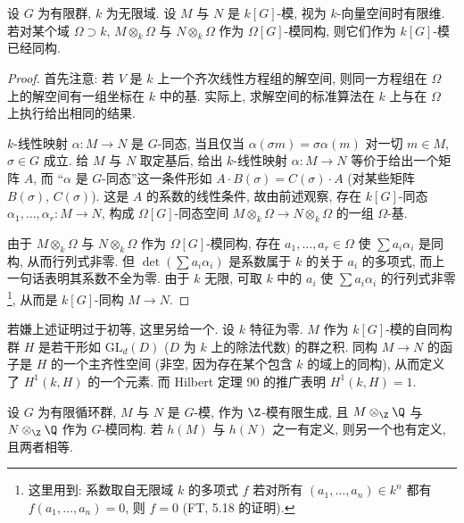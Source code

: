 \begin{lemma}\label{lem:vii.3.2}
设 $G$ 为有限群, $k$ 为无限域. 设 $M$ 与 $N$ 是 $k[G]$-模, 视为 $k$-向量空间时有限维. 若对某个域 $\Omega\supset k$, $M\otimes_k\Omega$ 与 $N\otimes_k\Omega$ 作为 $\Omega[G]$-模同构, 则它们作为 $k[G]$-模已经同构.
\end{lemma}

\begin{proof}
首先注意: 若 $V$ 是 $k$ 上一个齐次线性方程组的解空间, 则同一方程组在 $\Omega$ 上的解空间有一组坐标在 $k$ 中的基. 实际上, 求解空间的标准算法在 $k$ 上与在 $\Omega$ 上执行给出相同的结果.

$k$-线性映射 $\alpha\colon M\to N$ 是 $G$-同态, 当且仅当 $\alpha(\sigma m)=\sigma\alpha(m)$ 对一切 $m\in M$, $\sigma\in G$ 成立. 给 $M$ 与 $N$ 取定基后, 给出 $k$-线性映射 $\alpha\colon M\to N$ 等价于给出一个矩阵 $A$, 而 ``$\alpha$ 是 $G$-同态''这一条件形如 $A\cdot B(\sigma)=C(\sigma)\cdot A$ (对某些矩阵 $B(\sigma)$, $C(\sigma)$). 这是 $A$ 的系数的线性条件, 故由前述观察, 存在 $k[G]$-同态 $\alpha_1,\ldots,\alpha_r\colon M\to N$, 构成 $\Omega[G]$-同态空间 $M\otimes_k\Omega\to N\otimes_k\Omega$ 的一组 $\Omega$-基.

由于 $M\otimes_k\Omega$ 与 $N\otimes_k\Omega$ 作为 $\Omega[G]$-模同构, 存在 $a_1,\ldots,a_r\in\Omega$ 使 $\sum a_i\alpha_i$ 是同构, 从而行列式非零. 但 $\det(\sum a_i\alpha_i)$ 是系数属于 $k$ 的关于 $a_i$ 的多项式, 而上一句话表明其系数不全为零. 由于 $k$ 无限, 可取 $k$ 中的 $a_i$ 使 $\sum a_i\alpha_i$ 的行列式非零\footnote{这里用到: 系数取自无限域 $k$ 的多项式 $f$ 若对所有 $(a_1,\ldots,a_n)\in k^{n}$ 都有 $f(a_1,\ldots,a_n)=0$, 则 $f=0$ (FT, 5.18 的证明).}, 从而是 $k[G]$-同构 $M\to N$.
\end{proof}

\begin{remark}\label{rem:vii.3.3}
若嫌上述证明过于初等, 这里另给一个. 设 $k$ 特征为零. $M$ 作为 $k[G]$-模的自同构群 $H$ 是若干形如 $\mathrm{GL}_d(D)$ ($D$ 为 $k$ 上的除法代数) 的群之积. 同构 $M\to N$ 的函子是 $H$ 的一个主齐性空间 (非空, 因为存在某个包含 $k$ 的域上的同构), 从而定义了 $H^{1}(k,H)$ 的一个元素. 而 Hilbert 定理 90 的推广表明 $H^{1}(k,H)=1$.
\end{remark}

\begin{lemma}\label{lem:vii.3.4}
设 $G$ 为有限循环群, $M$ 与 $N$ 是 $G$-模, 作为 $\Z$-模有限生成, 且 $M\otimes_{\Z}\Q$ 与 $N\otimes_{\Z}\Q$ 作为 $G$-模同构. 若 $h(M)$ 与 $h(N)$ 之一有定义, 则另一个也有定义, 且两者相等.
\end{lemma}

